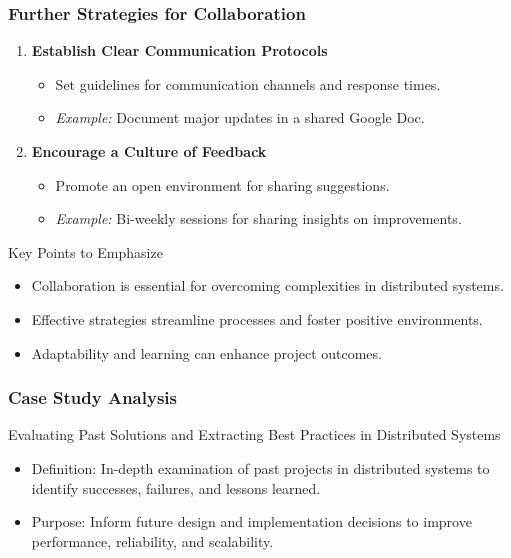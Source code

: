 \documentclass[aspectratio=169]{beamer}
\begin{document}
\begin{frame}[fragile]
    \frametitle{Further Strategies for Collaboration}
    \begin{enumerate}[resume]
        \item \textbf{Establish Clear Communication Protocols}
        \begin{itemize}
            \item Set guidelines for communication channels and response times.
            \item \textit{Example:} Document major updates in a shared Google Doc.
        \end{itemize}
        
        \item \textbf{Encourage a Culture of Feedback}
        \begin{itemize}
            \item Promote an open environment for sharing suggestions.
            \item \textit{Example:} Bi-weekly sessions for sharing insights on improvements.
        \end{itemize}
    \end{enumerate}

    \begin{block}{Key Points to Emphasize}
        \begin{itemize}
            \item Collaboration is essential for overcoming complexities in distributed systems.
            \item Effective strategies streamline processes and foster positive environments.
            \item Adaptability and learning can enhance project outcomes.
        \end{itemize}
    \end{block}
\end{frame}

\begin{frame}[fragile]
  \frametitle{Case Study Analysis}
  \begin{block}{Evaluating Past Solutions and Extracting Best Practices in Distributed Systems}
    \begin{itemize}
      \item Definition: In-depth examination of past projects in distributed systems to identify successes, failures, and lessons learned.
      \item Purpose: Inform future design and implementation decisions to improve performance, reliability, and scalability.
    \end{itemize}
  \end{block}
\end{frame}
\end{document}
